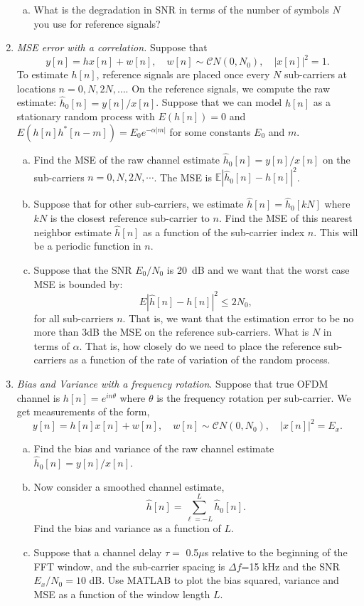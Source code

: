 \documentclass[11pt]{article}
\def\Exp{\mathbb{E}}
\begin{document}
\begin{enumerate}
\begin{enumerate}[(a)]
\item What is the degradation in SNR in terms of the number of symbols $N$ you use for reference signals?
\end{enumerate}


\item \emph{MSE error with a correlation.}  Suppose that
\[
    y[n]=hx[n]+w[n], \quad w[n] \sim {\mathcal CN}(0,N_0), \quad |x[n]|^2 = 1.
\]
To estimate $h[n]$, reference signals are placed once every $N$ sub-carriers
at locations $n=0,N,2N,\ldots$.
On the reference signals, we compute the raw estimate:
$\hat{h}_0[n] = y[n]/x[n]$.
Suppose that we can model $h[n]$ as a stationary random process with $E(h[n])=0$
and $E(h[n]h^*[n-m]) = E_0 e^{-\alpha|m|}$ for some constants $E_0$ and $m$.
\begin{enumerate}[(a)]
  \item Find the MSE of the raw channel estimate $\hat{h}_0[n] = y[n]/x[n]$
  on the sub-carriers $n=0,N,2N,\cdots$.  The MSE is $\Exp|\hat{h}_0[n]-h[n]|^2$.
  \item Suppose that for other sub-carriers, we estimate $\hat{h}[n] = \hat{h}_0[kN]$ where $kN$ is the
  closest reference sub-carrier to $n$.  Find the MSE of this nearest neighbor estimate 
  $\hat{h}[n]$
  as a function of the sub-carrier index $n$.  This will be a periodic function in $n$.
  \item Suppose that the SNR $E_0/N_0$ is 20~dB and we want that the worst case
  MSE is bounded by:
  \[
        E|\hat{h}[n] - h[n]|^2 \leq 2N_0,
  \]
  for all sub-carriers $n$.  That is, we want that the estimation error to be no more than 3dB
  the MSE on the reference sub-carriers.  What is $N$ in terms of $\alpha$.  That is, how closely
  do we need to place the reference sub-carriers as a function of the rate of variation
  of the random process.
\end{enumerate}

\item \emph{Bias and Variance with a frequency rotation}.
Suppose that true OFDM channel is $h[n] = e^{in\theta}$ where $\theta$ is the
frequency rotation per sub-carrier.  We get measurements of the form,
\[
    y[n]=h[n]x[n]+w[n], \quad w[n] \sim {\mathcal CN}(0,N_0), \quad |x[n]|^2 = E_x.
\]
\begin{enumerate}[(a)]
\item Find the bias and variance of the raw channel estimate $\hat{h}_0[n] = y[n]/x[n]$.

\item Now consider a smoothed channel estimate,
\[
    \hat{h}[n] = \sum_{\ell=-L}^L \hat{h}_0[n].
\]
Find the bias and variance as a function of $L$.

\item Suppose that a channel delay $\tau = $ 0.5$\mu$s relative to the beginning of the FFT window,
and the sub-carrier spacing is $\Delta f$=15 kHz and the SNR $E_x/N_0=10$ dB.  Use MATLAB to plot
the bias squared, variance and MSE as a function of the window length $L$.
\end{enumerate}



\end{enumerate}
\end{document}
